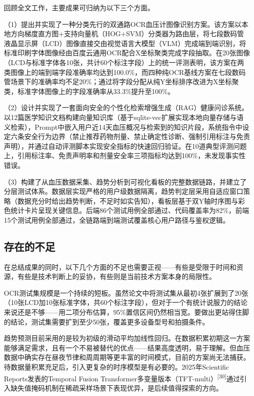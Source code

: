 \documentclass[zihao=-4,a4paper]{ctexart}
\begin{document}
回顾全文工作，主要成果可归纳为以下三个方面。

（1）提出并实现了一种分类先行的双通路OCR血压计图像识别方案。该方案以本地方向梯度直方图+支持向量机（HOG+SVM）分类器为路由层，将七段数码管液晶显示屏（LCD）图像直接交由视觉语言大模型（VLM）完成端到端识别，将标准印刷字体图像经由百度云通用OCR配合X坐标聚类完成字段抽取。在20张图像（LCD与标准字体各10张，共计60个标注字段）上的统一评测表明，该方案在两类图像上的端到端字段准确率均达到100.0\%，而四种纯OCR基线方案在七段数码管场景下的准确率均不足20\%；通过将字段分配从纯Y坐标排序改进为X坐标聚类，标准字体图像上的字段准确率从33.3\%提升至100\%。

（2）设计并实现了一套面向安全的个性化检索增强生成（RAG）健康问诊系统。以12篇医学知识文档构建向量知识库（基于sqlite-vec扩展实现本地向量存储与语义检索），Prompt中嵌入用户近14天血压概况与检索到的知识片段，系统指令中设定六条安全行为边界（禁止推荐药物剂量、禁止确定性诊断、强制引用标注与免责声明），并通过自动评测脚本实现安全指标的快速回归验证。在10道典型评测问题上，引用标注率、免责声明率和剂量安全率三项指标均达到100\%，未发现事实性错误。

（3）构建了从血压数据采集、趋势分析到可视化看板的完整数据链路，并建立了分层测试体系。数据层实现严格的用户级数据隔离，趋势判定层采用自适应窗口策略（数据充分时给出趋势判断，不足时如实告知），看板层基于双Y轴时序图与彩色统计卡片呈现关键信息。后端86个测试用例全部通过、代码覆盖率为82\%，前端15个测试用例全部通过，全链路端到端测试覆盖核心用户路径与鉴权逻辑。

\subsection{存在的不足}

在总结成果的同时，以下几个方面的不足也需要正视——有些是受限于时间和资源，有些是技术判断上的妥协，有些则是当前技术方案本身的局限性。

OCR测试集规模是一个持续的短板。虽然论文中将测试集从最初4张扩展到了20张（10张LCD加10张标准字体，共60个标注字段），但对于一个有统计说服力的结论来说还是不够——用二项分布估算，95\%置信区间仍然相当宽。要做出更站得住脚的结论，测试集需要扩到至少50张，覆盖更多设备型号和拍摄条件。

趋势预测目前采用的是较为初级的滑动平均加线性回归。在数据积累初期这一方案能够满足需求，且有一个不易被替代的优点——结果高度透明，易于理解。但血压数据中确实存在昼夜节律和周周期等更丰富的时间模式，目前的方案尚无法捕获。待数据量积累充足后，引入更复杂的时序模型是有必要的。2025年Scientific Reports发表的Temporal Fusion Transformer多变量版本（TFT-multi）\textsuperscript{[30]}通过引入缺失值掩码机制在稀疏采样场景下表现优异，是后续值得探索的方向。
\end{document}
